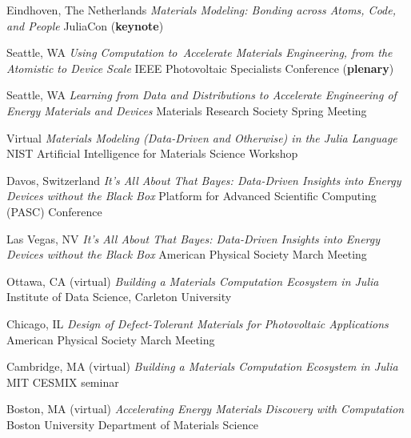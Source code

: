         {Eindhoven, The Netherlands}
        {\textit{Materials Modeling: Bonding across Atoms, Code, and People}}
        {JuliaCon (\textbf{keynote})}

\vspace{\talkyearsep}
\datedsubsection{}
        {Seattle, WA}
        {\textit{Using Computation to Accelerate Materials Engineering, from the Atomistic to Device Scale}}
        {IEEE Photovoltaic Specialists Conference (\textbf{plenary})}

\vspace{\talksep}
\datedsubsection{}
        {Seattle, WA}
        {\textit{Learning from Data and Distributions to Accelerate Engineering of Energy Materials and Devices}}
        {Materials Research Society Spring Meeting}

\vspace{\talksep}
    {Virtual}
    {\textit{Materials Modeling (Data-Driven and Otherwise) in the Julia Language}}
    {NIST Artificial Intelligence for Materials Science Workshop}

\vspace{\talksep}
\datedsubsection{}
    {Davos, Switzerland}
    {\textit{It's All About That Bayes: Data-Driven Insights into Energy Devices without the Black Box}}
    {Platform for Advanced Scientific Computing (PASC) Conference}

\vspace{\talksep}
\datedsubsection{}
    {Las Vegas, NV}
    {\textit{It's All About That Bayes: Data-Driven Insights into Energy Devices without the Black Box}}
    {American Physical Society March Meeting}

\vspace{\talksep}
\datedsubsection{}
    {Ottawa, CA (virtual)}
    {\textit{Building a Materials Computation Ecosystem in Julia}}
    {Institute of Data Science, Carleton University}

\vspace{\talksep}
\datedsubsection{}
    {Chicago, IL}
    {\textit{Design of Defect-Tolerant Materials for Photovoltaic Applications}}
    {American Physical Society March Meeting}

\vspace{\talksep}
\datedsubsection{}
    {Cambridge, MA (virtual)}
    {\textit{Building a Materials Computation Ecosystem in Julia}}
    {MIT CESMIX seminar}

\vspace{\talksep}
\datedsubsection{}
    {Boston, MA (virtual)}
    {\textit{Accelerating Energy Materials Discovery with Computation}}
    {Boston University Department of Materials Science}

